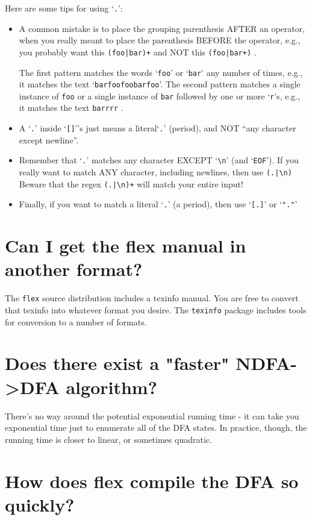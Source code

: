 \documentclass[openany,oneside]{book}
\begin{document}
Here are some tips for using ‘\verb`.`’:
\begin{itemize}
\item A common mistake is to place the grouping parenthesis AFTER an operator, when
you really meant to place the parenthesis BEFORE the operator, e.g., you
probably want this \verb`(foo|bar)+` and NOT this \verb`(foo|bar+)` .

The first pattern matches the words ‘\verb`foo`’ or ‘\verb`bar`’ any number of
times, e.g., it matches the text ‘\verb`barfoofoobarfoo`’. The
second pattern matches a single instance of \verb`foo` or a single instance of \verb`bar` followed by one or more ‘\verb`r`’s, e.g., it matches the text \verb`barrrr` .
\item A ‘\verb`.`’ inside ‘\verb`[]`’'s just means a literal‘\verb`.`’ (period),
and NOT “any character except newline”.
\item Remember that ‘\verb`.`’ matches any character EXCEPT ‘\verb`\n`’ (and ‘\verb`EOF`’). 
If you really want to match ANY character, including newlines, then use \verb`(.|\n)` Beware that the regex \verb`(.|\n)+` will match your entire input!
\item Finally, if you want to match a literal ‘\verb`.`’ (a period), then use ‘\verb`[.]`’ or ‘\verb`"."`’
\end{itemize}

\section{Can I get the flex manual in another format?}


The \verb`flex` source distribution  includes a texinfo manual. You are
free to convert that texinfo into whatever format you desire. The \verb`texinfo` package includes tools for conversion to a number of formats.
\section{Does there exist a "faster" NDFA->DFA algorithm?}


There's no way around the potential exponential running time - it
can take you exponential time just to enumerate all of the DFA states. 
In practice, though, the running time is closer to linear, or sometimes
quadratic.
\section{How does flex compile the DFA so quickly?}
\end{document}
